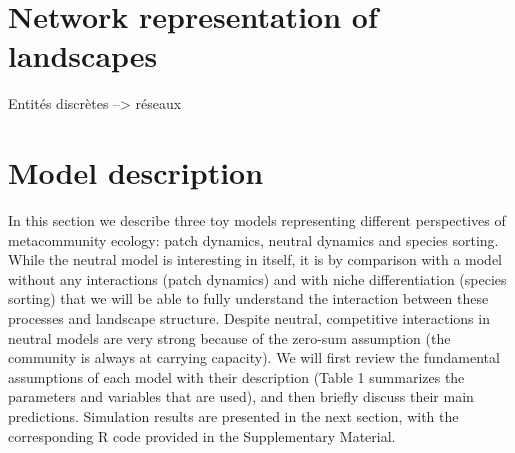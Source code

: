 \documentclass[12pt]{article}
\begin{document}
\section{Network representation of landscapes}

Entités discrètes --> réseaux

 


 

\section*{Model description}

In this section we describe three toy models representing different
perspectives of metacommunity ecology: patch dynamics, neutral dynamics and
species sorting. While the neutral model is interesting in itself, it is by
comparison with a model without any interactions (patch dynamics) and with niche
differentiation (species sorting) that we will be able to fully understand the
interaction between these processes and landscape structure. Despite neutral,
competitive interactions in neutral models are very strong because of the
zero-sum assumption (the community is always at carrying capacity). We will
first review the fundamental assumptions of each model with their description
(Table 1 summarizes the parameters and variables that are used), and then
briefly discuss their main predictions. Simulation results are presented in the
next section, with the corresponding R code provided in the Supplementary
Material.
\end{document}
